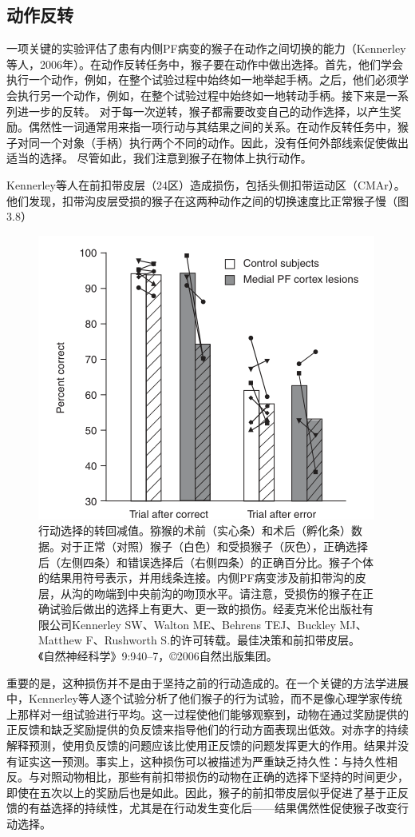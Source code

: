 \subsection{动作反转}
一项关键的实验评估了患有内侧PF病变的猴子在动作之间切换的能力（Kennerley等人，2006年）。在动作反转任务中，猴子要在动作中做出选择。首先，他们学会执行一个动作，例如，在整个试验过程中始终如一地举起手柄。之后，他们必须学会执行另一个动作，例如，在整个试验过程中始终如一地转动手柄。接下来是一系列进一步的反转。
对于每一次逆转，猴子都需要改变自己的动作选择，以产生奖励。偶然性一词通常用来指一项行动与其结果之间的关系。在动作反转任务中，猴子对同一个对象（手柄）执行两个不同的动作。因此，没有任何外部线索促使做出适当的选择。
尽管如此，我们注意到猴子在物体上执行动作。\par
Kennerley等人在前扣带皮层（24区）造成损伤，包括头侧扣带运动区（CMAr）。他们发现，扣带沟皮层受损的猴子在这两种动作之间的切换速度比正常猴子慢（图3.8）\par
\begin{figure}[!htb]
	\centering
 	\includegraphics{image_pfc/Fig_3_8}
	\caption{行动选择的转回减值。猕猴的术前（实心条）和术后（孵化条）数据。对于正常（对照）猴子（白色）和受损猴子（灰色），正确选择后（左侧四条）和错误选择后（右侧四条）的正确百分比。猴子个体的结果用符号表示，并用线条连接。内侧PF病变涉及前扣带沟的皮层，从沟的吻端到中央前沟的吻顶水平。请注意，受损伤的猴子在正确试验后做出的选择上有更大、更一致的损伤。经麦克米伦出版社有限公司Kennerley SW、Walton ME、Behrens TEJ、Buckley MJ、Matthew F、Rushworth S.的许可转载。最佳决策和前扣带皮层。《自然神经科学》9:940–7，©2006自然出版集团。}
	\label{fig:fig}
\end{figure}
重要的是，这种损伤并不是由于坚持之前的行动造成的。在一个关键的方法学进展中，Kennerley等人逐个试验分析了他们猴子的行为试验，而不是像心理学家传统上那样对一组试验进行平均。这一过程使他们能够观察到，动物在通过奖励提供的正反馈和缺乏奖励提供的负反馈来指导他们的行动方面表现出低效。对赤字的持续解释预测，使用负反馈的问题应该比使用正反馈的问题发挥更大的作用。结果并没有证实这一预测。事实上，这种损伤可以被描述为严重缺乏持久性：与持久性相反。与对照动物相比，那些有前扣带损伤的动物在正确的选择下坚持的时间更少，即使在五次以上的奖励后也是如此。因此，猴子的前扣带皮层似乎促进了基于正反馈的有益选择的持续性，尤其是在行动发生变化后——结果偶然性促使猴子改变行动选择。\par
